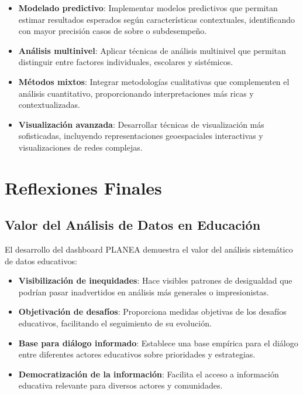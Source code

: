 \begin{itemize}
    \item \textbf{Modelado predictivo}: Implementar modelos predictivos que permitan estimar resultados esperados según características contextuales, identificando con mayor precisión casos de sobre o subdesempeño.
    
    \item \textbf{Análisis multinivel}: Aplicar técnicas de análisis multinivel que permitan distinguir entre factores individuales, escolares y sistémicos.
    
    \item \textbf{Métodos mixtos}: Integrar metodologías cualitativas que complementen el análisis cuantitativo, proporcionando interpretaciones más ricas y contextualizadas.
    
    \item \textbf{Visualización avanzada}: Desarrollar técnicas de visualización más sofisticadas, incluyendo representaciones geoespaciales interactivas y visualizaciones de redes complejas.
\end{itemize}

\section{Reflexiones Finales}

\subsection{Valor del Análisis de Datos en Educación}
El desarrollo del dashboard PLANEA demuestra el valor del análisis sistemático de datos educativos:

\begin{itemize}
    \item \textbf{Visibilización de inequidades}: Hace visibles patrones de desigualdad que podrían pasar inadvertidos en análisis más generales o impresionistas.
    
    \item \textbf{Objetivación de desafíos}: Proporciona medidas objetivas de los desafíos educativos, facilitando el seguimiento de su evolución.
    
    \item \textbf{Base para diálogo informado}: Establece una base empírica para el diálogo entre diferentes actores educativos sobre prioridades y estrategias.
    
    \item \textbf{Democratización de la información}: Facilita el acceso a información educativa relevante para diversos actores y comunidades.
\end{itemize}

